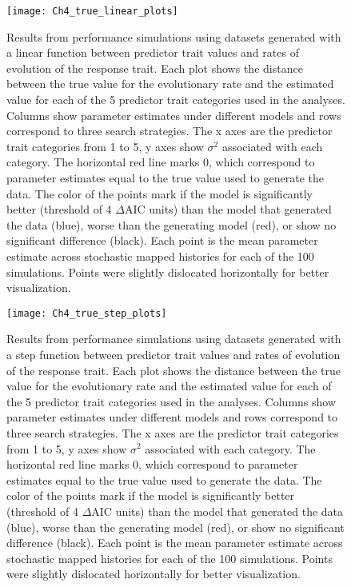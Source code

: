\begin{figure}[hp]
	\centering
	\texttt{[image: Ch4\_true\_linear\_plots]}
	\caption[Results from performance simulations using datasets generated with a linear function between predictor trait values and rates of evolution of the response trait.]{Results from performance simulations using datasets generated with a linear function between predictor trait values and rates of evolution of the response trait. Each plot shows the distance between the true value for the evolutionary rate and the estimated value for each of the 5 predictor trait categories used in the analyses. Columns show parameter estimates under different models and rows correspond to three search strategies. The x axes are the predictor trait categories from 1 to 5, y axes show $\sigma^{2}$ associated with each category. The horizontal red line marks 0, which correspond to parameter estimates equal to the true value used to generate the data. The color of the points mark if the model is significantly better (threshold of 4 $\Delta$AIC units) than the model that generated the data (blue), worse than the generating model (red), or show no significant difference (black). Each point is the mean parameter estimate across stochastic mapped histories for each of the 100 simulations. Points were slightly dislocated horizontally for better visualization.}
	\label{fig:chart_linear}
\end{figure}

\begin{figure}[hp]
	\centering
	\texttt{[image: Ch4\_true\_step\_plots]}
	\caption[Results from performance simulations using datasets generated with a step function between predictor trait values and rates of evolution of the response trait.]{Results from performance simulations using datasets generated with a step function between predictor trait values and rates of evolution of the response trait. Each plot shows the distance between the true value for the evolutionary rate and the estimated value for each of the 5 predictor trait categories used in the analyses. Columns show parameter estimates under different models and rows correspond to three search strategies. The x axes are the predictor trait categories from 1 to 5, y axes show $\sigma^{2}$ associated with each category. The horizontal red line marks 0, which correspond to parameter estimates equal to the true value used to generate the data. The color of the points mark if the model is significantly better (threshold of 4 $\Delta$AIC units) than the model that generated the data (blue), worse than the generating model (red), or show no significant difference (black). Each point is the mean parameter estimate across stochastic mapped histories for each of the 100 simulations. Points were slightly dislocated horizontally for better visualization.}
	\label{fig:chart_step}
\end{figure}

